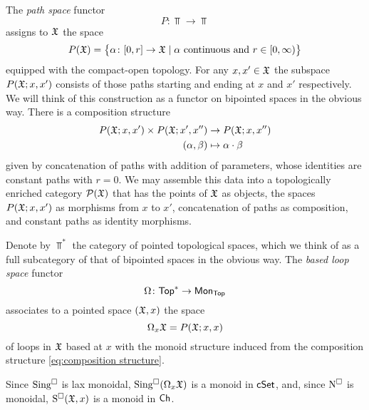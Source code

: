The \textit{path space} functor
\[
P \colon \Top \to \Top
\]
assigns to $\mathfrak{X}$ the space
\[
P(\mathfrak{X}) = \big\{\alpha \colon [0,r] \to \mathfrak{X} \mid \text{$\alpha$ continuous and } r \in [0,\infty)\big\}
\]
equipped with the compact-open topology.
For any $x,x' \in \mathfrak{X}$ the subspace $P(\mathfrak{X};x,x')$ consists of those paths starting and ending at $x$ and $x'$ respectively.
We will think of this construction as a functor on bipointed spaces in the obvious way.
There is a composition structure
\begin{equation}\label{eq:composition structure}
	\begin{split}
		P(\mathfrak{X};x,x') \times P(\mathfrak{X};x',x'') &\to P(\mathfrak{X};x,x'') \\
		(\alpha, \beta) &\mapsto \alpha \cdot \beta
	\end{split}
\end{equation}
given by concatenation of paths with addition of parameters, whose identities are constant paths with $r=0$. We may assemble this data into a topologically enriched category $\mathcal{P}(\mathfrak{X})$ that has the points of $\mathfrak{X}$ as objects, the spaces $P(\mathfrak{X};x,x')$ as morphisms from $x$ to $x'$, concatenation of paths as composition, and constant paths as identity morphisms. 

Denote by $\Top^\ast$ the category of pointed topological spaces, which we think of as a full subcategory of that of bipointed spaces in the obvious way.
The \textit{based loop space} functor
\[
\Omega \colon \mathsf{Top}^\ast \to \mathsf{Mon}_{\mathsf{Top}}
\]
associates to a pointed space $(\mathfrak{X},x)$ the space
\[
\Omega_x \mathfrak{X} = P(\mathfrak{X};x,x)
\]
of loops in $\mathfrak{X}$ based at $x$ with the monoid structure induced from the composition structure \eqref{eq:composition structure}.


Since $\operatorname{Sing^{\square}}$ is lax monoidal, $\operatorname{Sing^{\square}}(\Omega_x \mathfrak{X})$ is a monoid in $\mathsf{cSet}$, and, since $\operatorname{N^{\square}}$ is monoidal, $\operatorname{S^{\square}}(\mathfrak{X},x)$ is a monoid in $\mathsf{Ch}$.

